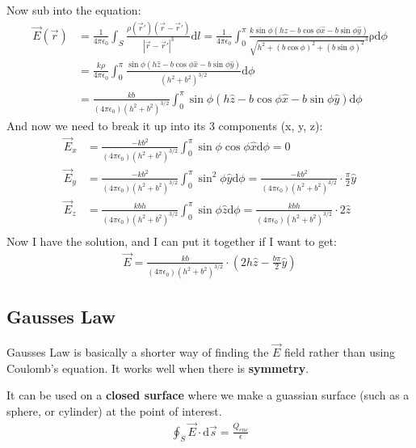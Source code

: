 \documentclass[12pt,letterpaper]{article} \usepackage{amsmath} \usepackage{graphicx} \usepackage[margin=1in]{geometry} \usepackage{longtable}  \usepackage{amssymb}
\begin{document}
\begin{mdframed}
		Now sub into the equation:
		\begin{align*}
			\vec E (\vec r) &= \frac{1}{4\pi \epsilon_0} \int_S \frac{\rho(\vec r\prime)(\vec r - \vec r\prime)}{|\vec r - \vec r\prime | ^3}\mathrm d l = \frac{1}{4\pi \epsilon_0} \int_0^\pi \frac{k\sin\phi(h\hat z - b\cos\phi\hat x - b\sin\phi\hat y)}{\sqrt{h^2 + (b\cos\phi)^2+(b\sin\phi)^2}  ^3}\mathrm \rho\mathrm d \phi \\
			&=\frac{k\rho}{4\pi \epsilon_0} \int_0^\pi \frac{\sin\phi(h\hat z - b\cos\phi\hat x - b\sin\phi\hat y)}{(h^2 + b^2)^{3/2}}\mathrm d \phi\\
			&=\frac{kb}{(4\pi \epsilon_0)(h^2 + b^2)^{3/2}} \int_0^\pi \sin\phi(h\hat z - b\cos\phi\hat x - b\sin\phi\hat y)\mathrm d \phi
		\end{align*}
		And now we need to break it up into its 3 components (x, y, z):
		\begin{align*}
			\vec E_x &= \frac{-kb^2}{(4\pi \epsilon_0)(h^2 + b^2)^{3/2}} \int_0^\pi \sin\phi\cos\phi\hat x\mathrm d \phi = 0\\
			\vec E_y &= \frac{-kb^2}{(4\pi \epsilon_0)(h^2 + b^2)^{3/2}} \int_0^\pi \sin^2\phi\hat y\mathrm d \phi = \frac{-kb^2}{(4\pi \epsilon_0)(h^2 + b^2)^{3/2}} \cdot \frac{\pi}{2}\hat y\\
			\vec E_z &= \frac{kbh}{(4\pi \epsilon_0)(h^2 + b^2)^{3/2}} \int_0^\pi \sin\phi\hat z\mathrm d \phi = \frac{kbh}{(4\pi \epsilon_0)(h^2 + b^2)^{3/2}} \cdot 2\hat z\\
		\end{align*}
		Now I have the solution, and I can put it together if I want to get:
		\begin{align*}
			\vec E = \frac{kb}{(4\pi \epsilon_0)(h^2 + b^2)^{3/2}} \cdot \left(2h\hat z - \frac{b\pi}{2}\hat y\right)
		\end{align*}
	\end{mdframed}
	
	\subsection{Gausses Law}
	Gausses Law is basically a shorter way of finding the $\vec E$ field rather than using Coulomb's equation. It works well when there is \textbf{symmetry}.
	
	It can be used on a \textbf{closed surface} where we make a guassian surface (such as a sphere, or cylinder) at the point of interest. 
	\begin{align*}
		\oint_S \vec E \cdot \mathrm d \vec s = \frac{Q_{enc}}{\epsilon}
	\end{align*}
\end{document}

